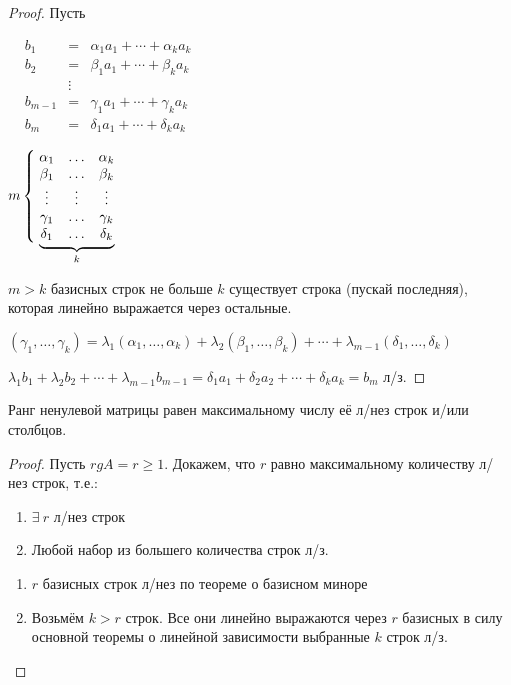 \begin{proof} Пусть

$\begin{matrix}
& b_1&=&\alpha_1a_1+\cdots+\alpha_ka_k & \\
& b_2&=&\beta_1a_1+\cdots+\beta_ka_k & \\
& &\vdots & &\\
& b_{m-1}&=&\gamma_1a_1+\cdots+\gamma_ka_k & \\
& b_m&=&\delta_1a_1+\cdots+\delta_ka_k &
\end{matrix}$

$m\left\{\lefteqn{\phantom{\begin{matrix}\alpha_1 \\ \beta_1 \\ \vdots \\ \gamma_1 \\ \delta_1 \end{matrix}}}\right.
\underbrace{
\begin{matrix}
\alpha_1 & \ldots & \alpha_k \\
\beta_1  & \ldots & \beta_k  \\
\vdots   & \vdots & \vdots   \\
\gamma_1 & \ldots & \gamma_k \\
\delta_1 & \ldots & \delta_k
\end{matrix}}_{k}$

$m>k$ \then базисных строк не больше $k$ \then существует строка (пускай последняя), которая линейно выражается через остальные.

$(\gamma_1,\ldots,\gamma_k)=\lambda_1(\alpha_1,\ldots,\alpha_k)+\lambda_2(\beta_1,\ldots,\beta_k)+\cdots+\lambda_{m-1}(\delta_1,\ldots,\delta_k)$

$\lambda_1b_1+\lambda_2b_2+\cdots+\lambda_{m-1}b_{m-1}=\delta_1a_1+\delta_2a_2+\cdots+\delta_ka_k=b_m$ \then л/з.
\end{proof}
\begin{theor}

Ранг ненулевой матрицы равен максимальному числу её л/нез строк и/или столбцов.
\end{theor}
\begin{proof}
Пусть $rg A=r\geq1$. Докажем, что $r$ равно максимальному количеству л/нез строк, т.е.: \begin{enumerate}
\item $\exists\ r$ л/нез строк
\item Любой набор из большего количества строк л/з.
\end{enumerate}
\begin{enumerate}
\item $r$ базисных строк л/нез по теореме о базисном миноре
\item Возьмём $k>r$ строк. Все они линейно выражаются через $r$ базисных \then в силу основной теоремы о линейной зависимости выбранные $k$ строк л/з.
\end{enumerate}
\end{proof}
